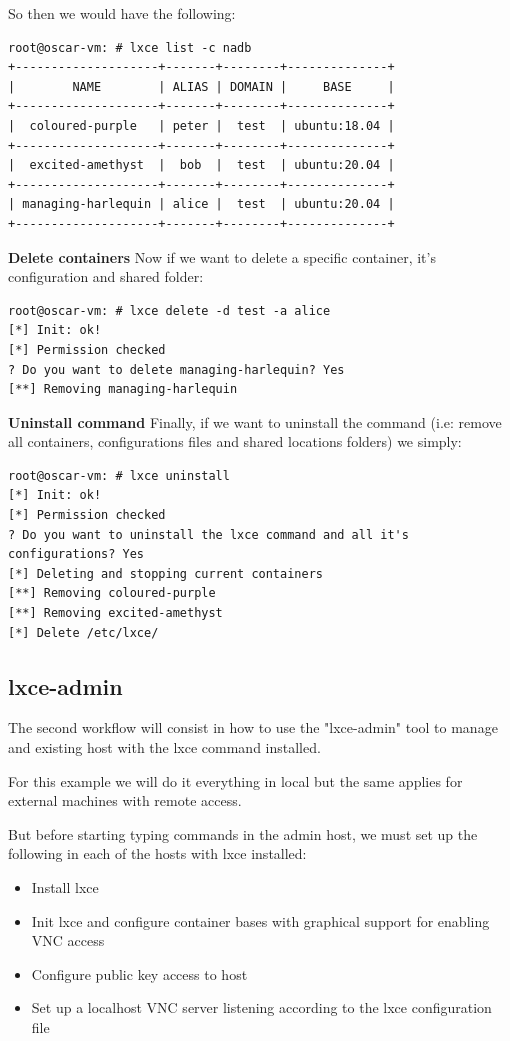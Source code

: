 So then we would have the following:
\begin{verbatim}
root@oscar-vm: # lxce list -c nadb
+--------------------+-------+--------+--------------+
|        NAME        | ALIAS | DOMAIN |     BASE     |
+--------------------+-------+--------+--------------+
|  coloured-purple   | peter |  test  | ubuntu:18.04 |
+--------------------+-------+--------+--------------+
|  excited-amethyst  |  bob  |  test  | ubuntu:20.04 |
+--------------------+-------+--------+--------------+
| managing-harlequin | alice |  test  | ubuntu:20.04 |
+--------------------+-------+--------+--------------+
\end{verbatim}

\textbf{Delete containers}
Now if we want to delete a specific container, it's configuration and shared folder:

\begin{verbatim}
root@oscar-vm: # lxce delete -d test -a alice
[*] Init: ok!
[*] Permission checked
? Do you want to delete managing-harlequin? Yes
[**] Removing managing-harlequin
\end{verbatim}

\textbf{Uninstall command}
Finally, if we want to uninstall the command (i.e: remove all containers, configurations files and shared locations folders) we simply:
\begin{verbatim}
root@oscar-vm: # lxce uninstall
[*] Init: ok!
[*] Permission checked
? Do you want to uninstall the lxce command and all it's configurations? Yes
[*] Deleting and stopping current containers
[**] Removing coloured-purple
[**] Removing excited-amethyst
[*] Delete /etc/lxce/
\end{verbatim}

\subsection{lxce-admin}
The second workflow will consist in how to use the "lxce-admin" tool to manage and existing host with the lxce command installed.

For this example we will do it everything in local but the same applies for external machines with remote access.

But before starting typing commands in the admin host, we must set up the following in each of the hosts with lxce installed:
\begin{itemize}
	\item{Install lxce}
	\item{Init lxce and configure container bases with graphical support for enabling VNC access}
	\item{Configure public key access to host}
	\item{Set up a localhost VNC server listening according to the lxce configuration file}
\end{itemize}

